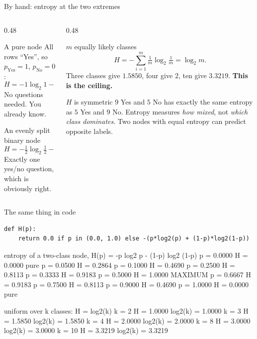 \documentclass[aspectratio=169]{beamer}
\begin{document}
\begin{frame}[shrink=8]{By hand: entropy at the two extremes}
  \begin{columns}[T]
    \begin{column}{0.48\textwidth}
      \begin{block}{A pure node}
        All rows ``Yes'', so $p_{\text{Yes}} = 1$, $p_{\text{No}} = 0$:
        \[ H = -1\log_2 1 - 0\log_2 0 = \mathbf{0}. \]
        No questions needed. You already know.
      \end{block}
      \begin{block}{An evenly split binary node}
        \[
          H = -\tfrac12\log_2\tfrac12 - \tfrac12\log_2\tfrac12
            = \tfrac12 + \tfrac12 = \mathbf{1}\ \text{bit}.
        \]
        Exactly one yes/no question, which is obviously right.
      \end{block}
    \end{column}
    \begin{column}{0.48\textwidth}
      \begin{block}{$m$ equally likely classes}
        \[
          H = -\sum_{i=1}^{m}\tfrac1m\log_2\tfrac1m = \log_2 m .
        \]
        Three classes give $1.5850$, four give $2$, ten give $3.3219$.
        \textbf{This is the ceiling.}
      \end{block}
      \begin{alertblock}{$H$ is symmetric}
        \small $9$ Yes and $5$ No has exactly the same entropy as $5$ Yes and
        $9$ No. Entropy measures \emph{how mixed}, not \emph{which class
        dominates}. Two nodes with equal entropy can predict opposite labels.
      \end{alertblock}
    \end{column}
  \end{columns}
\end{frame}

\begin{frame}[fragile,shrink=10]{The same thing in code}
\begin{lstlisting}
def H(p):
    return 0.0 if p in (0.0, 1.0) else -(p*log2(p) + (1-p)*log2(1-p))
\end{lstlisting}
\begin{outblk}
entropy of a two-class node, H(p) = -p log2 p - (1-p) log2 (1-p)
   p = 0.0000    H = 0.0000  pure
   p = 0.0500    H = 0.2864
   p = 0.1000    H = 0.4690
   p = 0.2500    H = 0.8113
   p = 0.3333    H = 0.9183
   p = 0.5000    H = 1.0000  MAXIMUM
   p = 0.6667    H = 0.9183
   p = 0.7500    H = 0.8113
   p = 0.9000    H = 0.4690
   p = 1.0000    H = 0.0000  pure
\end{outblk}
\begin{outblk}
uniform over k classes: H = log2(k)
   k =  2   H = 1.0000   log2(k) = 1.0000
   k =  3   H = 1.5850   log2(k) = 1.5850
   k =  4   H = 2.0000   log2(k) = 2.0000
   k =  8   H = 3.0000   log2(k) = 3.0000
   k = 10   H = 3.3219   log2(k) = 3.3219
\end{outblk}
\end{frame}
\end{document}

